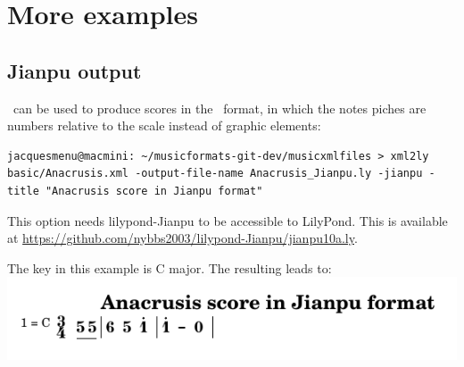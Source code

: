 



\chapter{More examples}


\section{Jianpu output}

\xmlToLy\ can be used to produce scores in the \jianpu\ format, in which the notes piches are numbers relative to the scale instead of graphic elements:
\begin{lstlisting}[language=Terminal]
jacquesmenu@macmini: ~/musicformats-git-dev/musicxmlfiles > xml2ly basic/Anacrusis.xml -output-file-name Anacrusis_Jianpu.ly -jianpu -title "Anacrusis score in Jianpu format"
\end{lstlisting}

This option needs lilypond-Jianpu to be accessible to LilyPond. This is available at \url{https://github.com/nybbs2003/lilypond-Jianpu/jianpu10a.ly}.

The key in this example is C major. The resulting  leads to:\\
\includegraphics[scale=1]{../mfgraphics/mfgraphicsAnacrusis_Jianpu.png}

